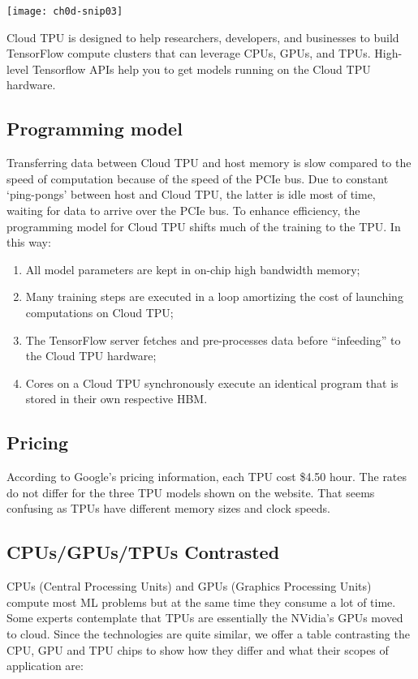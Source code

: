 {\centering \texttt{[image: ch0d-snip03]} \par}

Cloud TPU is designed to help researchers, developers, and businesses to build TensorFlow compute clusters that can leverage CPUs, GPUs, and TPUs. High-level Tensorflow APIs help you to get models running on the Cloud TPU hardware.

\subsection{Programming model}

Transferring data between Cloud TPU and host memory is slow compared to the speed of computation because of the speed of the PCIe bus. Due to constant ‘ping-pongs’ between host and Cloud TPU, the latter is idle most of time, waiting for data to arrive over the PCIe bus. To enhance efficiency, the programming model for Cloud TPU shifts much of the training to the TPU. In this way:

\begin{enumerate}
  \item All model parameters are kept in on-chip high bandwidth memory;
  \item Many training steps are executed in a loop amortizing the cost of launching computations on Cloud TPU;
  \item The TensorFlow server fetches and pre-processes data before ``infeeding'' to the Cloud TPU hardware;
  \item Cores on a Cloud TPU synchronously execute an identical program that is stored in their own respective HBM.
\end{enumerate}

\subsection{Pricing}

According to Google’s pricing information, each TPU cost \$4.50 hour. The rates do not differ for the three TPU models shown on the website. That seems confusing as TPUs have different memory sizes and clock speeds.

\subsection{CPUs/GPUs/TPUs Contrasted}

CPUs (Central Processing Units) and GPUs (Graphics Processing Units) compute most ML problems but at the same time they consume a lot of time. Some experts contemplate that TPUs are essentially the NVidia’s GPUs moved to cloud. Since the technologies are quite similar, we offer a table contrasting the CPU, GPU and TPU chips to show how they differ and what their scopes of application are:


